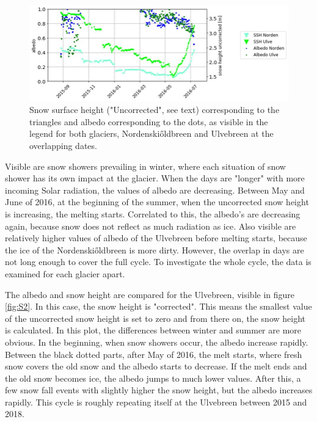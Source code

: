 \documentclass[11pt]{report}
\begin{document}
\begin{figure}[h]
\includegraphics[scale=1, width=1\textwidth]{Picture1.jpg}
\caption{Snow surface height ("Uncorrected", see text) corresponding to the triangles and albedo corresponding to the dots, as visible in the legend for both glaciers, Nordenski\H{o}ldbreen and Ulvebreen at the overlapping dates.}
\label{fig:S1}
\end{figure}

Visible are snow showers prevailing in winter, where each situation of snow shower has its own impact at the glacier. When the days are "longer" with more incoming Solar radiation, the values of albedo are decreasing. Between May and June of 2016, at the beginning of the summer, when the uncorrected snow height is increasing, the melting starts. Correlated to this, the albedo's are decreasing again, because snow does not reflect as much radiation as ice. Also visible are relatively higher values of albedo of the Ulvebreen before melting starts, because the ice of the Nordenski\H{o}ldbreen is more dirty. However, the overlap in days are not long enough to cover the full cycle. To investigate the whole cycle, the data is examined for each glacier apart. 

The albedo and snow height are compared for the Ulvebreen, visible in figure \ref{fig:S2}. In this case, the snow height is "corrected". This means the smallest value of the uncorrected snow height is set to zero and from there on, the snow height is calculated. In this plot, the differences between winter and summer are more obvious. In the beginning, when snow showers occur, the albedo increase rapidly. Between the black dotted parts, after May of 2016, the melt starts, where fresh snow covers the old snow and the albedo starts to decrease. If the melt ends and the old snow becomes ice, the albedo jumps to much lower values. After this, a few snow fall events with slightly higher the snow height, but the albedo increases rapidly. This cycle is roughly repeating itself at the Ulvebreen between 2015 and 2018. 
\end{document}
